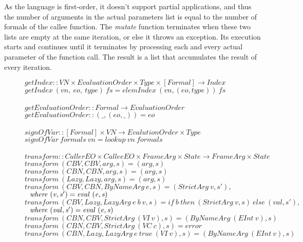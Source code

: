 \documentclass[diploma]{softlab-thesis}
\begin{document}
As the language is first-order, it doesn't support partial applications, and thus the number of arguments 
in the actual parameters list is equal to the number of formals of the callee function. The \textit{mutate} function 
terminates when these two lists are empty at the same iteration, or else it throws an exception. Its execution starts 
and continues until it terminates by processing each and every actual parameter of the function call. The result is 
a list that accumulates the result of every iteration. 


\begin{figure}[h]
  $\mathit{getIndex :: VN \times EvaluationOrder \times Type \times [Formal] \rightarrow Index}$ \\
  $\mathit{getIndex~(vn,~eo,~type)~fs=elemIndex~(vn,(eo,type))~fs}$ \\
  \\
  $\mathit{getEvaluationOrder :: Formal \rightarrow EvaluationOrder} $ \\
  $\mathit{getEvaluationOrder :: (\_, (eo, \_)) = eo}$ \\
  \\%
  $\mathit{signOfVar :: [Formal] \times VN \rightarrow EvalutionOrder \times Type } $ \\
  $\mathit{signOfVar~formals~vn = lookup~vn~formals}$ \\
  \\%
  $\mathit{transform :: CallerEO \times CalleeEO \times FrameArg \times 
            State \rightarrow FrameArg \times State}$ \\
  $\mathit{transform~(CBV, CBV, arg, s) = (arg, s)}$ \\
  $\mathit{transform~(CBN, CBN, arg, s) = (arg, s)}$ \\
  $\mathit{transform~(Lazy, Lazy, arg, s) = (arg, s)}$ \\
  $\mathit{transform~(CBV, CBN, ByNameArg~e, s) = (StrictArg~v, s'),}$ \\
  $\mathit{\hfill\ \hfill\ where~(v, s') = eval~(e, s)}$ \\
  $\mathit{transform~(CBV, Lazy, LazyArg~e~b~v, s) = 
              if~b~then~(StrictArg~v, s)~else~(val, s'),}$ \\
  $\mathit{\hfill\ \hfill\ where~(val, s') = eval~(e, s)} $ \\
  $\mathit{transform~(CBN, CBV, StrictArg~(VI~v),s)=(ByNameArg~(EInt~v),s)}$ \\
  $\mathit{transform~(CBN, CBV, StrictArg~(VC~c),s)=error}$ \\
  $\mathit{transform~(CBN, Lazy, LazyArg~e~true~(VI~v), s) = (ByNameArg~(EInt~v), s)}$ \\

\end{figure}
\end{document}
